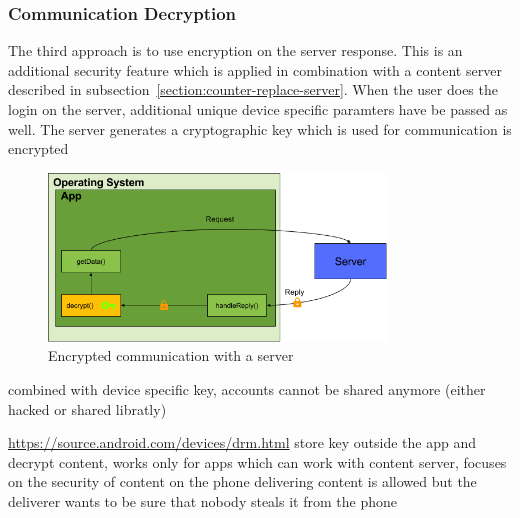 \subsubsection{Communication Decryption} \label{section:counter-replace-encryption-content-communication}
The third approach is to use encryption on the server response.
This is an additional security feature which is applied in combination with a content server described in subsection~\ref{section:counter-replace-server}.
When the user does the login on the server, additional unique device specific paramters have be passed as well.
The server generates a cryptographic key which is used for communication is encrypted
\begin{figure}[h]
    \centering
    \includegraphics[width=0.8\textwidth]{data/encryptionComm.png}
    \caption{Encrypted communication with a server}
    \label{fig:encryptionComm}
\end{figure}
combined with device specific key, accounts cannot be shared anymore (either hacked or shared libratly)


\url{https://source.android.com/devices/drm.html} store key outside the app and decrypt content, works only for apps which can work with content server, focuses on the security of content on the phone\newline
delivering content is allowed but the deliverer wants to be sure that nobody steals it from the phone
